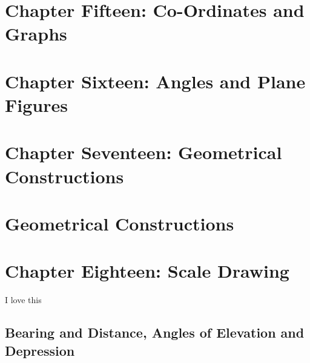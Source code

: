 \documentclass[
  letterpaper,
  DIV=11,
  numbers=noendperiod]{scrreprt}
\begin{document}

\hypertarget{chapter-fifteen-co-ordinates-and-graphs}{%
\chapter{Chapter Fifteen: Co-Ordinates and
Graphs}\label{chapter-fifteen-co-ordinates-and-graphs}}


\hypertarget{chapter-sixteen-angles-and-plane-figures}{%
\chapter{Chapter Sixteen: Angles and Plane
Figures}\label{chapter-sixteen-angles-and-plane-figures}}


\hypertarget{chapter-seventeen-geometrical-constructions}{%
\chapter{Chapter Seventeen: Geometrical
Constructions}\label{chapter-seventeen-geometrical-constructions}}


\hypertarget{geometrical-constructions}{%
\chapter*{Geometrical Constructions}\label{geometrical-constructions}}



\hypertarget{chapter-eighteen-scale-drawing}{%
\chapter{Chapter Eighteen: Scale
Drawing}\label{chapter-eighteen-scale-drawing}}

I love this

\hypertarget{bearing-and-distance-angles-of-elevation-and-depression}{%
\section{Bearing and Distance, Angles of Elevation and
Depression}\label{bearing-and-distance-angles-of-elevation-and-depression}}
\end{document}
